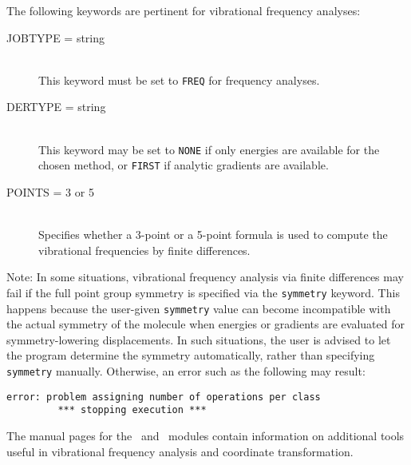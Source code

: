 The following keywords are pertinent for vibrational frequency analyses:
\begin{description}
\item[JOBTYPE = string]\mbox{}\\
This keyword must be set to {\tt FREQ} for frequency analyses.
\item[DERTYPE = string]\mbox{}\\
This keyword may be set to {\tt NONE} if only energies are available
for the chosen method, or {\tt FIRST} if analytic gradients are available.
\item[POINTS = 3 or 5]\mbox{}\\
Specifies whether a 3-point or a 5-point formula is used to compute the
vibrational frequencies by finite differences.
\end{description}

\begin{em}
Note: In some situations, vibrational frequency analysis via finite
differences may fail if the full point group symmetry is specified via
the {\tt symmetry} keyword.  This happens because the user-given
{\tt symmetry} value can become incompatible with the actual symmetry
of the molecule when energies or gradients are evaluated for
symmetry-lowering displacements.  In such situations, the user is
advised to let the program determine the symmetry automatically, rather
than specifying {\tt symmetry} manually.  Otherwise, an error such as the
following may result:
\end{em}

\begin{verbatim}
error: problem assigning number of operations per class
         *** stopping execution ***
\end{verbatim}

The manual pages for the \PSInormco\ and \PSIintder\ modules contain
information on additional tools useful in vibrational frequency analysis
and coordinate transformation.

